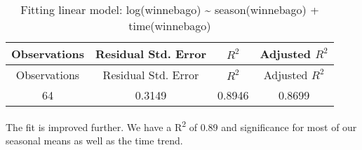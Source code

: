 \documentclass[]{book}
\theoremstyle{definition}
\theoremstyle{definition}
\theoremstyle{remark}
\begin{document}
\begin{longtable}[c]{@{}cccc@{}}
\caption{Fitting linear model: log(winnebago) \textasciitilde{}
season(winnebago) + time(winnebago)}\tabularnewline
\toprule
\begin{minipage}[b]{0.18\columnwidth}\centering\strut
Observations
\strut\end{minipage} &
\begin{minipage}[b]{0.27\columnwidth}\centering\strut
Residual Std. Error
\strut\end{minipage} &
\begin{minipage}[b]{0.10\columnwidth}\centering\strut
\(R^2\)
\strut\end{minipage} &
\begin{minipage}[b]{0.20\columnwidth}\centering\strut
Adjusted \(R^2\)
\strut\end{minipage}\tabularnewline
\midrule
\endfirsthead
\toprule
\begin{minipage}[b]{0.18\columnwidth}\centering\strut
Observations
\strut\end{minipage} &
\begin{minipage}[b]{0.27\columnwidth}\centering\strut
Residual Std. Error
\strut\end{minipage} &
\begin{minipage}[b]{0.10\columnwidth}\centering\strut
\(R^2\)
\strut\end{minipage} &
\begin{minipage}[b]{0.20\columnwidth}\centering\strut
Adjusted \(R^2\)
\strut\end{minipage}\tabularnewline
\midrule
\endhead
\begin{minipage}[t]{0.18\columnwidth}\centering\strut
64
\strut\end{minipage} &
\begin{minipage}[t]{0.27\columnwidth}\centering\strut
0.3149
\strut\end{minipage} &
\begin{minipage}[t]{0.10\columnwidth}\centering\strut
0.8946
\strut\end{minipage} &
\begin{minipage}[t]{0.20\columnwidth}\centering\strut
0.8699
\strut\end{minipage}\tabularnewline
\bottomrule
\end{longtable}

The fit is improved further. We have a R\textsuperscript{2} of 0.89 and
significance for most of our seasonal means as well as the time trend.
\end{document}
